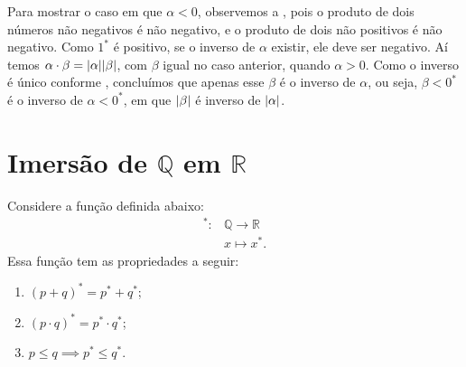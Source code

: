 \documentclass[../main.tex]{subfiles}
\begin{document}
\begin{dem}
    Para mostrar o caso em que $\alpha < 0$, observemos a , pois o produto de dois números não negativos é não negativo, e o produto de dois não positivos é não negativo. Como $1^*$ é positivo, se o inverso de $\alpha$ existir, ele deve ser negativo. Aí temos 
    $\alpha \cdot \beta = \abs{\alpha} \abs{\beta}$, com $\beta$ igual no caso anterior, quando $\alpha > 0$. Como o inverso é único conforme , concluímos que apenas esse $\beta$ é o inverso de $\alpha$, ou seja, $\beta < 0^*$ é o inverso de $\alpha < 0^*$, em que $\abs{\beta}$ é inverso de $\abs{\alpha}$.
    
\end{dem}


\section{Imersão de $\mathbb{Q}$ em $\mathbb{R}$}
\begin{teo}\label{reais-teo-imersao}
    Considere a função definida abaixo:
    \begin{align*}
        ^* \colon &\mathbb{Q} \to \mathbb{R} \\
        &x \mapsto x^*.
    \end{align*}
    Essa função tem as propriedades a seguir:
    \begin{enumerate}[label=(\roman*)]
        \item $(p + q)^* = p^* + q^*$;
        \item $(p \cdot q)^* = p^* \cdot q^*$;
        \item $p \leq q \implies p^* \leq q^*$.
    \end{enumerate}
\end{teo}
\end{document}
